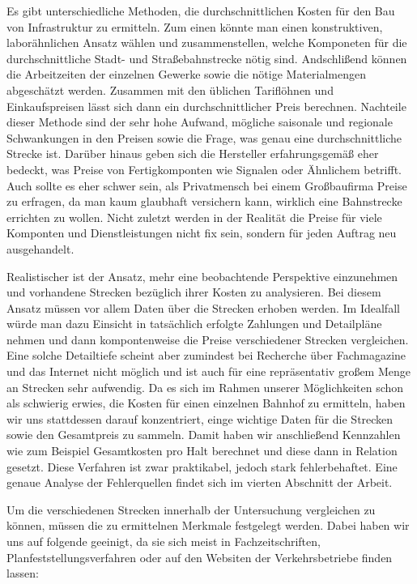 Es gibt unterschiedliche Methoden, die durchschnittlichen Kosten für den Bau von
Infrastruktur zu ermitteln. Zum einen könnte man einen konstruktiven,
laborähnlichen Ansatz wählen und zusammenstellen, welche Komponeten für die
durchschnittliche Stadt- und Straßebahnstrecke nötig sind. Andschlißend können
die Arbeitzeiten der einzelnen Gewerke sowie die nötige Materialmengen
abgeschätzt werden. Zusammen mit den üblichen Tariflöhnen und Einkaufspreisen
lässt sich dann ein durchschnittlicher Preis berechnen. Nachteile dieser Methode
sind der sehr hohe Aufwand, mögliche saisonale und regionale Schwankungen in den
Preisen sowie die Frage, was genau eine durchschnittliche Strecke ist. Darüber
hinaus geben sich die Hersteller erfahrungsgemäß eher bedeckt, was Preise von
Fertigkomponten wie Signalen oder Ähnlichem betrifft. Auch sollte es eher schwer
sein, als Privatmensch bei einem Großbaufirma Preise zu erfragen, da man kaum
glaubhaft versichern kann, wirklich eine Bahnstrecke errichten zu wollen. Nicht
zuletzt werden in der Realität die Preise für viele Komponten und
Dienstleistungen nicht fix sein, sondern für jeden Auftrag neu ausgehandelt.

Realistischer ist der Ansatz, mehr eine beobachtende Perspektive einzunehmen und
vorhandene Strecken bezüglich ihrer Kosten zu analysieren. Bei diesem Ansatz
müssen vor allem Daten über die Strecken erhoben werden. Im Idealfall würde man
dazu Einsicht in tatsächlich erfolgte Zahlungen und Detailpläne nehmen und dann
kompontenweise die Preise verschiedener Strecken vergleichen. Eine solche
Detailtiefe scheint aber zumindest bei Recherche über Fachmagazine und das
Internet nicht möglich und ist auch für eine repräsentativ großem Menge an
Strecken sehr aufwendig. Da es sich im Rahmen unserer Möglichkeiten schon als
schwierig erwies, die Kosten für einen einzelnen Bahnhof zu ermitteln, haben wir
uns stattdessen darauf konzentriert, einge wichtige Daten für die Strecken sowie
den Gesamtpreis zu sammeln. Damit haben wir anschließend Kennzahlen wie zum
Beispiel Gesamtkosten pro Halt berechnet und diese dann in Relation
gesetzt. Diese Verfahren ist zwar praktikabel, jedoch stark fehlerbehaftet. Eine
genaue Analyse der Fehlerquellen findet sich im vierten Abschnitt der Arbeit.

Um die verschiedenen Strecken innerhalb der Untersuchung vergleichen zu können,
müssen die zu ermittelnen Merkmale festgelegt werden. Dabei haben wir uns auf
folgende geeinigt, da sie sich meist in Fachzeitschriften,
Planfeststellungsverfahren oder auf den Websiten der Verkehrsbetriebe finden
lassen:

